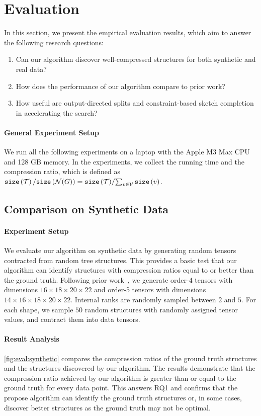 \section{Evaluation}\label{sec:eval}
%
In this section, we present the empirical evaluation results, which aim to answer the following research questions:
\begin{enumerate}[label=\textbf{(RQ\arabic*)},align=left,parsep=-1ex,topsep=0ex]
    \item Can our algorithm discover well-compressed structures for both synthetic and real data?
    \item How does the performance of our algorithm compare to prior work?
    \item How useful are output-directed splits and constraint-based sketch completion in accelerating the search?
\end{enumerate}

\paragraph{General Experiment Setup}
%
We run all the following experiments on a laptop with the Apple M3 Max CPU and 128 GB memory.
%
In the experiments, we collect the running time and the compression ratio, which is defined as $\mathtt{size}\left(\mathcal{T}\right)\slash{\mathtt{size}\left(\mathcal{N}(G)\right)} = {\mathtt{size}\left(\mathcal{T}\right)}\slash{\sum_{v\in \mathcal{V}}\mathtt{size}\left(v\right)}$.

\subsection{Comparison on Synthetic Data}\label{sec:eval:synthetic}
\paragraph{Experiment Setup}
%
We evaluate our algorithm on synthetic data by generating random tensors contracted from random tree structures.
%
This provides a basic test that our algorithm can identify structures with compression ratios equal to or better than the ground truth.
%
Following prior work~\cite{zheng2024svdinstn}, we generate order-4 tensors with dimensions $16 \times 18 \times 20 \times 22$ and order-5 tensors with dimensions $14 \times 16 \times 18 \times 20 \times 22$.
%
Internal ranks are randomly sampled between $2$ and $5$.
%
For each shape, we sample $50$ random structures with randomly assigned tensor values, and contract them into data tensors.

\paragraph{Result Analysis}
%
\cref{fig:eval:synthetic} compares the compression ratios of the ground truth structures and the structures discovered by our algorithm.
%
The results demonstrate that the compression ratio achieved by our algorithm is greater than or equal to the ground truth for every data point.
%
This answers RQ1 and confirms that the propose algorithm can identify the ground truth structures or, in some cases, discover better structures as the ground truth may not be optimal.

